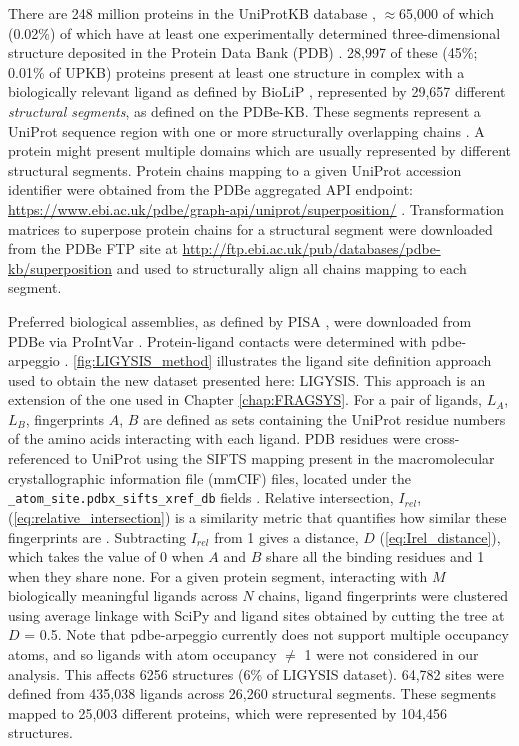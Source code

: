 There are 248 million proteins in the UniProtKB database \cite{UNIPROT_2020_UNIPROT}, $\approx$65,000 of which (0.02\%) of which have at least one experimentally determined three-dimensional structure deposited in the Protein Data Bank (PDB) \cite{ARMSTRONG_2020_PDBE}. 28,997 of these (45\%; 0.01\% of UPKB) proteins present at least one structure in complex with a biologically relevant ligand as defined by BioLiP \cite{YANG_2013_BIOLIP}, represented by 29,657 different \textit{structural segments}, as defined on the PDBe-KB. These segments represent a UniProt sequence region with one or more structurally overlapping chains  \cite{ELLAWAY_2024_CONFORMATIONS}. A protein might present multiple domains which are usually represented by different structural segments. Protein chains mapping to a given UniProt accession identifier were obtained from the PDBe aggregated API endpoint: \url{https://www.ebi.ac.uk/pdbe/graph-api/uniprot/superposition/} \cite{PDBEKB_2019_PDBEKB}. Transformation matrices to superpose protein chains for a structural segment were downloaded from the PDBe FTP site at \url{http://ftp.ebi.ac.uk/pub/databases/pdbe-kb/superposition} \cite{PDBE_2022_PDBEKB} and used to structurally align all chains mapping to each segment.

Preferred biological assemblies, as defined by PISA \cite{KRISSINEL_2007_PISA}, were downloaded from PDBe via ProIntVar \cite{MACGOWAN_2020_DRSASP}. Protein-ligand contacts were determined with pdbe-arpeggio \cite{JUBB_2017_ARPEGGIO}. \autoref{fig:LIGYSIS_method} illustrates the ligand site definition approach used to obtain the new dataset presented here: LIGYSIS. This approach is an extension of the one used in Chapter \ref{chap:FRAGSYS}. For a pair of ligands, $L_A$, $L_B$, fingerprints $A$, $B$ are defined as sets containing the UniProt residue numbers of the amino acids interacting with each ligand. PDB residues were cross-referenced to UniProt using the SIFTS mapping present in the macromolecular crystallographic information file (mmCIF) files, located under the \texttt{\_atom\_site.pdbx\_si\discretionary{-}{}{}fts\_xref\_db} fields \cite{VELANKAR_2012_SIFTS, DANA_2018_SIFTS}. Relative intersection, $I_{rel}$, (\autoref{eq:relative_intersection}) is a similarity metric that quantifies how similar these fingerprints are \cite{UTGES_2024_FRAGSYS}. Subtracting $I_{rel}$ from 1 gives a distance, $D$ (\autoref{eq:Irel_distance}), which takes the value of 0 when $A$ and $B$ share all the binding residues and 1 when they share none. For a given protein segment, interacting with $M$ biologically meaningful ligands across $N$ chains, ligand fingerprints were clustered using average linkage with SciPy \cite{VIRTANEN_2020_SCIPY} and ligand sites obtained by cutting the tree at $D$ = 0.5. Note that pdbe-arpeggio currently does not support multiple occupancy atoms, and so ligands with atom occupancy $\neq$ 1 were not considered in our analysis. This affects 6256 structures (6\% of LIGYSIS dataset). 64,782 sites were defined from 435,038 ligands across 26,260 structural segments. These segments mapped to 25,003 different proteins, which were represented by 104,456 structures.


